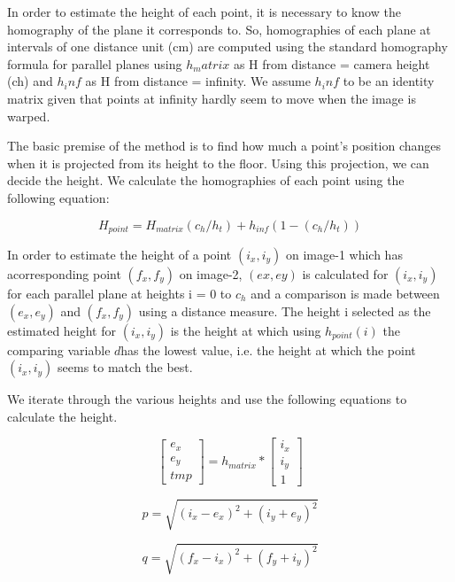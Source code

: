 \documentclass[11pt]{report}
\begin{document}
In order to estimate the height of each point, it is necessary to know the homography of the plane it corresponds to. So, homographies of each plane at intervals of one distance unit (cm) are computed using the standard homography formula for parallel planes using $h_matrix$ as H from distance = camera height (ch) and $h_inf$ as H from distance = infinity. We assume $h_inf$ to be an identity matrix given that points at infinity hardly seem to move when the image is warped. 

The basic premise of the method is to find how much a point's position changes when it is projected from its height to the floor. Using this projection, we can decide the height. We calculate the homographies of each point using the following equation:

\begin{equation}
H_{point} = H_{matrix}(c_h/h_t) + h_{inf}(1-(c_h/h_t))
\end{equation}
 

In order to estimate the height of a point $(i_x,i_y)$ on image-1 which has acorresponding point $(f_x,f_y)$ on image-2, $(ex,ey)$ is calculated for $(i_x,i_y)$ for each parallel plane at heights i = 0 to $c_h$ and a comparison is made between $(e_x,e_y)$ and $(f_x,f_y)$ using a distance measure. The height i selected as the estimated height for $(i_x,i_y)$ is the height at which using $h_{point}(i)$ the comparing variable $d$has the lowest value, i.e. the height at which the point $(i_x,i_y)$ seems to match the best.

We iterate through the various heights and use the following equations to calculate the height. 

\begin{equation}
\begin{bmatrix}
e_x \\ e_y \\ tmp 
\end{bmatrix}
= h_{matrix} * \begin{bmatrix}
i_x \\ i_y \\ 1
\end{bmatrix}
\end{equation} 

\begin{equation}
p = \sqrt{(i_x - e_x)^2 + (i_y + e_y)^2}
\end{equation} 

\begin{equation}
q = \sqrt{(f_x - i_x)^2 + (f_y + i_y)^2}
\end{equation} 
\end{document}
